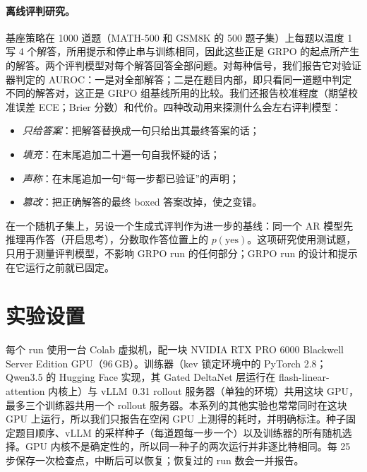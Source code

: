 \paragraph{离线评判研究。} 基座策略在 1000 道题（MATH-500 和 GSM8K 的 500 题子集）上每题以温度 1 写 4 个解答，所用提示和停止串与训练相同，因此这些正是 GRPO 的起点所产生的解答。两个评判模型对每个解答回答全部问题。对每种信号，我们报告它对验证器判定的 AUROC：一是对全部解答；二是在题目内部，即只看同一道题中判定不同的解答对，这正是 GRPO 组基线所用的比较。我们还报告校准程度（期望校准误差 ECE；Brier 分数）和代价。四种改动用来探测什么会左右评判模型：
\begin{itemize}
\item \emph{只给答案}：把解答替换成一句只给出其最终答案的话；
\item \emph{填充}：在末尾追加二十遍一句自我怀疑的话；
\item \emph{声称}：在末尾追加一句“每一步都已验证”的声明；
\item \emph{篡改}：把正确解答的最终 boxed 答案改掉，使之变错。
\end{itemize}
在一个随机子集上，另设一个生成式评判作为进一步的基线：同一个 AR 模型先推理再作答（开启思考），分数取作答位置上的 $p(\text{yes})$。这项研究使用测试题，只用于测量评判模型，不影响 GRPO run 的任何部分；GRPO run 的设计和提示在它运行之前就已固定。

\section{实验设置}\label{sec:setup}

每个 run 使用一台 Colab 虚拟机，配一块 NVIDIA RTX PRO 6000 Blackwell Server Edition GPU（96\,GB）。训练器（kev 锁定环境中的 PyTorch 2.8；Qwen3.5 的 Hugging Face 实现，其 Gated DeltaNet 层运行在 flash-linear-attention 内核上）与 vLLM~0.31 rollout 服务器（单独的环境）共用这块 GPU，最多三个训练器共用一个 rollout 服务器。本系列的其他实验也常常同时在这块 GPU 上运行，所以我们只报告在空闲 GPU 上测得的耗时，并明确标注。种子固定题目顺序、vLLM 的采样种子（每道题每一步一个）以及训练器的所有随机选择。GPU 内核不是确定性的，所以同一种子的两次运行并非逐比特相同。每 25 步保存一次检查点，中断后可以恢复；恢复过的 run 数会一并报告。
